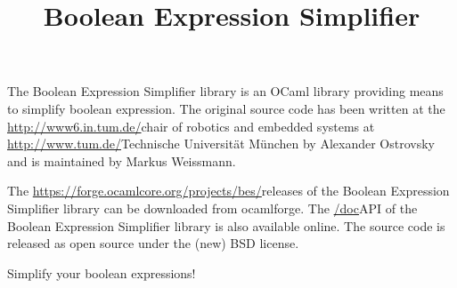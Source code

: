 \documentclass{article}
\title{Boolean Expression Simplifier}
\date{}
\author{}
\begin{document}
\maketitle
\thispagestyle{empty}
The Boolean Expression Simplifier library is an OCaml library providing means to simplify boolean expression.
The original source code has been written at the \url{http://www6.in.tum.de/}{chair of robotics and embedded systems} at \url{http://www.tum.de/}{Technische Universit\"at M\"unchen} by Alexander Ostrovsky and is maintained by Markus Weissmann.

The \url{https://forge.ocamlcore.org/projects/bes/}{releases of the Boolean Expression Simplifier library} can be downloaded from ocamlforge.
The \url{/doc}{API of the Boolean Expression Simplifier library} is also available online.
The source code is released as open source under the (new) BSD license.

Simplify your boolean expressions!
\end{document}
